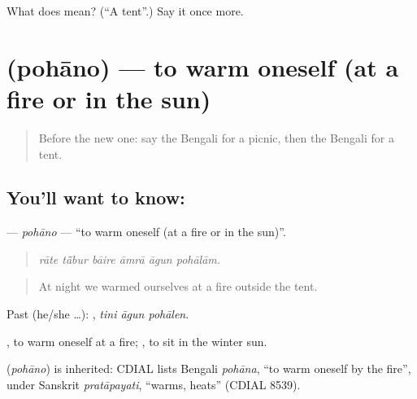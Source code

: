 \begin{tcolorbox}[breakable,colback=teal!4,colframe=teal!35!black,title={Before you move on}]
What does  mean? (\textquotedblleft{}A tent\textquotedblright{}.) Say it once more.
\end{tcolorbox}
\section[\texorpdfstring{\bn{পোহানো} (pohāno)}{পোহানো (pohāno)}]{ (pohāno) — to warm oneself (at a fire or in the sun)}

\label{lesson:BN-C399-pohano}



\begin{quote}
Before the new one: say the Bengali for a picnic, then the Bengali for a tent.
\end{quote}

\subsection*{You'll want to know: }
\textbf{} — \emph{pohāno} — \textquotedblleft{}to warm oneself (at a fire or in the sun)\textquotedblright{}.

\begin{quote}
     
\end{quote}

\begin{quote}
\emph{rāte tā̃bur bāire āmrā āgun pohālām.}
\end{quote}

\begin{quote}
At night we warmed ourselves at a fire outside the tent.
\end{quote}

Past (he/she …):   , \emph{tini āgun pohālen}.

 , to warm oneself at a fire;  , to sit in the winter sun.

\begin{cousinweb}
\textbf{} (\emph{pohāno}) is inherited: CDIAL lists Bengali \emph{pohāna}, \textquotedblleft{}to warm oneself by the fire\textquotedblright{}, under Sanskrit \emph{pratāpayati}, \textquotedblleft{}warms, heats\textquotedblright{} (CDIAL 8539).
\end{cousinweb}

